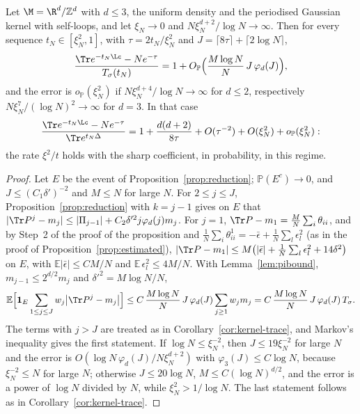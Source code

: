 \begin{corollary}\label{cor:secondstage}
Let $\M=\R^d/\mathbb Z^d$ with $d\le3$, the uniform density and the periodised Gaussian kernel with self-loops, and let $\xi_N\to0$ and $N\xi_N^{d+2}/\log N\to\infty$. Then for every sequence $t_N\in[\xi_N^2,1]$, with $\tau=2t_N/\xi_N^2$ and $J=\lceil8\tau\rceil+\lceil2\log N\rceil$,
\[
\frac{\Tr e^{-t_N\Lc}-Ne^{-\tau}}{T_\sigma(t_N)}=1+O_{\mathbb P}\Big(\frac{M\log N}{N}\,J\,\varphi_d(J)\Big),
\]
and the error is $o_{\mathbb P}(\xi_N^2)$ if $N\xi_N^{d+4}/\log N\to\infty$ for $d\le2$, respectively $N\xi_N^{7}/(\log N)^2\to\infty$ for $d=3$. In that case
\[
\frac{\Tr e^{-t_N\Lc}-Ne^{-\tau}}{\Tr e^{t_N\Delta}}=1+\frac{d(d+2)}{8\tau}+O(\tau^{-2})+O(\xi_N^2)+o_{\mathbb P}(\xi_N^2):
\]
the rate $\xi^2/t$ holds with the sharp coefficient, in probability, in this regime.
\end{corollary}

\begin{proof}
Let $E$ be the event of Proposition~\ref{prop:reduction}; $\mathbb P(E^c)\to0$, and $J\le(C_1\delta')^{-2}$ and $M\le N$ for large $N$. For $2\le j\le J$, Proposition~\ref{prop:reduction} with $k=j-1$ gives on $E$ that $|\Tr P^j-m_j|\le|\Pi_{j-1}|+C_2\delta'^2j\varphi_d(j)m_j$. For $j=1$, $\Tr P-m_1=\frac MN\sum_i\theta_{ii}$, and by Step~2 of the proof of the proposition and $\frac1N\sum_i\theta^1_{ii}=-\bar\epsilon+\frac1N\sum_l\epsilon_l^2$ (as in the proof of Proposition~\ref{prop:estimated}), $|\Tr P-m_1|\le M\big(|\bar\epsilon|+\frac1N\sum_l\epsilon_l^2+14\delta^2\big)$ on $E$, with $\mathbb E|\bar\epsilon|\le CM/N$ and $\mathbb E\,\epsilon_l^2\le4M/N$. With Lemma~\ref{lem:pibound}, $m_{j-1}\le2^{d/2}m_j$ and $\delta'^2=M\log N/N$,
\[
\mathbb E\Big[\mathbf 1_E\sum_{1\le j\le J}w_j\big|\Tr P^j-m_j\big|\Big]\le C\,\frac{M\log N}{N}\,J\,\varphi_d(J)\sum_{j\ge1}w_jm_j=C\,\frac{M\log N}{N}\,J\,\varphi_d(J)\,T_\sigma .
\]
The terms with $j>J$ are treated as in Corollary~\ref{cor:kernel-trace}, and Markov's inequality gives the first statement. If $\log N\le\xi_N^{-2}$, then $J\le19\xi_N^{-2}$ for large $N$ and the error is $O(\log N\,\varphi_d(J)/N\xi_N^{d+2})$ with $\varphi_3(J)\le C\log N$, because $\xi_N^{-2}\le N$ for large $N$; otherwise $J\le20\log N$, $M\le C(\log N)^{d/2}$, and the error is a power of $\log N$ divided by $N$, while $\xi_N^2>1/\log N$. The last statement follows as in Corollary~\ref{cor:kernel-trace}.
\end{proof}

